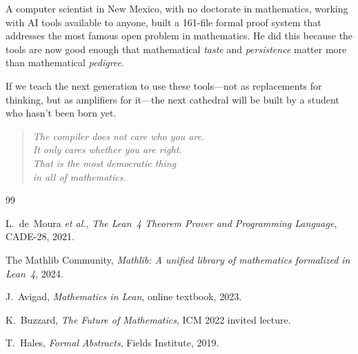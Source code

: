 \documentclass[11pt,a4paper]{article}
\begin{document}
A computer scientist in New Mexico, with no doctorate in
mathematics, working with AI tools available to anyone, built a
161-file formal proof system that addresses the most famous open
problem in mathematics. He did this because the tools are now
good enough that mathematical \emph{taste} and \emph{persistence}
matter more than mathematical \emph{pedigree}.

If we teach the next generation to use these tools---not as
replacements for thinking, but as amplifiers for it---the next
cathedral will be built by a student who hasn't been born yet.

\begin{quote}
\emph{The compiler does not care who you are.\\
It only cares whether you are right.\\
That is the most democratic thing\\
in all of mathematics.}
\end{quote}

\begin{thebibliography}{99}

L.~de~Moura \emph{et al.}, \emph{The Lean~4 Theorem Prover and
Programming Language}, CADE-28, 2021.

The Mathlib Community, \emph{Mathlib: A unified library of
mathematics formalized in Lean~4}, 2024.

J.~Avigad, \emph{Mathematics in Lean}, online textbook, 2023.

K.~Buzzard, \emph{The Future of Mathematics}, ICM 2022 invited
lecture.

T.~Hales, \emph{Formal Abstracts}, Fields Institute, 2019.

\end{thebibliography}
\end{document}
